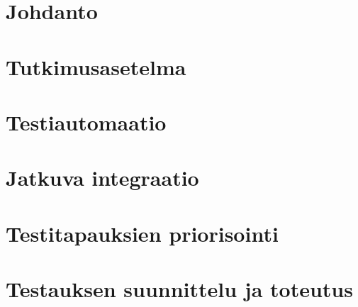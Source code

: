 \documentclass[finnish, authoryear]{config/tauthesis}
\theoremstyle{definition}
\begin{document}



\glossary


\mainmatter

\chapter{Johdanto}
\label{ch:johdanto}


\chapter{Tutkimusasetelma}
\label{ch:tutkimusasetelma}


\chapter{Testiautomaatio}
\label{ch:testiautomaatio}


\chapter{Jatkuva integraatio}
\label{ch:jatkuva_integraatio}


\chapter{Testitapauksien priorisointi}
\label{ch:testitapauksien_priorisointi}


\chapter{Testauksen suunnittelu ja toteutus}
\label{ch:testauksen_suunnittelu_ja_toteutus}

\end{document}
